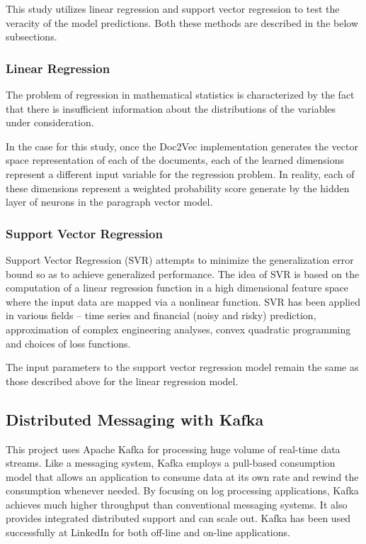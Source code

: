 \documentclass[conference]{IEEEtran}
\begin{document}
        This study utilizes linear regression and support vector regression to test the veracity of the model predictions. Both these methods are described in the below subsections.

    \subsubsection{Linear Regression}
        The problem of regression in mathematical statistics is characterized by the fact that there is insufficient information about the distributions of the variables under consideration\cite{regression_analysis}.

        In the case for this study, once the Doc2Vec implementation generates the vector space representation of each of the documents, each of the learned dimensions represent a different input variable for the regression problem. In reality, each of these dimensions represent a weighted probability score generate by the hidden layer of neurons in the paragraph vector model.

    \subsubsection{Support Vector Regression}
        Support Vector Regression (SVR) attempts to minimize the generalization error bound so as to achieve generalized performance. The idea of SVR is based on the computation of a linear regression function in a high dimensional feature space where the input data are mapped via a nonlinear function. SVR has been applied in various fields – time series and financial (noisy and risky) prediction, approximation of complex engineering analyses, convex quadratic programming and choices of loss functions\cite{basak2007support}.

        The input parameters to the support vector regression model remain the same as those described above for the linear regression model.


    \subsection{Distributed Messaging with Kafka}
        This project uses Apache Kafka for processing huge volume of real-time data streams. Like a messaging system, Kafka employs a pull-based consumption model that allows an application to consume data at its own rate and rewind the consumption whenever needed. By focusing on log processing applications, Kafka achieves much higher throughput than conventional messaging systems. It also provides integrated distributed support and can scale out. Kafka has been used successfully at LinkedIn for both off-line and on-line applications. \cite{kreps2011kafka}
\end{document}
